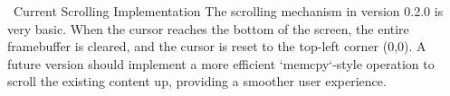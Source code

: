 \documentclass[a4paper, 11pt]{article}
\begin{document}
	\begin{warningbox}{\faExclamationTriangle\ Current Scrolling Implementation}
		The scrolling mechanism in version 0.2.0 is very basic. When the cursor reaches the bottom of the screen, the entire framebuffer is cleared, and the cursor is reset to the top-left corner (0,0). A future version should implement a more efficient `memcpy`-style operation to scroll the existing content up, providing a smoother user experience.
	\end{warningbox}
	
\end{document}
